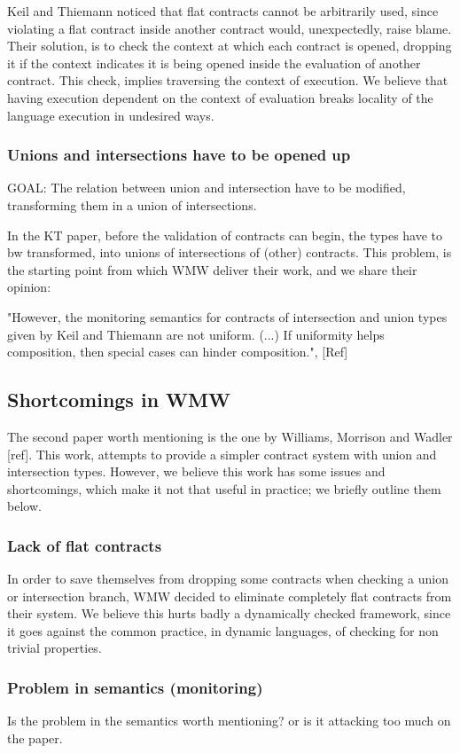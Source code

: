 Keil and Thiemann noticed that flat contracts cannot be arbitrarily used, since
violating a flat contract inside another contract would, unexpectedly, raise blame.
Their solution, is to check the context at which each contract is opened, dropping
it if the context indicates it is being opened inside the evaluation of another
contract.
This check, implies traversing the context of execution. We believe that
having execution dependent on the context of evaluation breaks locality of
the language execution in undesired ways.

\subsubsection*{Unions and intersections have to be opened up}

GOAL: The relation between union and intersection have to be modified, transforming them
in a union of intersections.

In the KT paper, before the validation of contracts can begin, the types have to bw
transformed, into unions of intersections of (other) contracts. This problem,
is the starting point from which WMW deliver their work, and we share their opinion:

"However, the monitoring semantics for contracts of intersection and union types given by Keil
and Thiemann are not uniform. (...) If uniformity helps composition, then
special cases can hinder composition.", [Ref]

\subsection{Shortcomings in WMW}

The second paper worth mentioning is the one by Williams, Morrison and Wadler [ref].
This work, attempts to provide a simpler contract system with
union and intersection types.
However, we believe this work has some issues and shortcomings, which make it
not that useful in practice; we briefly outline them below.

\subsubsection*{Lack of flat contracts}

In order to save themselves from dropping some contracts when checking a union
or intersection branch, WMW decided to eliminate completely flat contracts from
their system.
We believe this hurts badly a dynamically checked framework, since it goes against
the common practice, in dynamic languages, of checking for non trivial properties.

\subsubsection*{Problem in semantics (monitoring)}
Is the problem in the semantics worth mentioning? or is it attacking too much on the paper.
